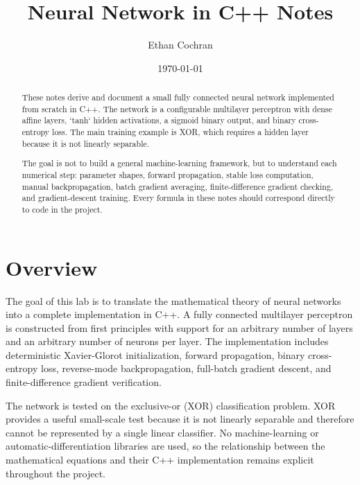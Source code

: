 \documentclass{article}
\title{Neural Network in C++ Notes}
\author{Ethan Cochran}
\date{\today}
\begin{document}
\maketitle

\begin{abstract}
These notes derive and document a small fully connected neural network implemented from scratch in C++. The network is a configurable multilayer perceptron with dense affine layers, `tanh` hidden activations, a sigmoid binary output, and binary cross-entropy loss. The main training example is XOR, which requires a hidden layer because it is not linearly separable.

The goal is not to build a general machine-learning framework, but to understand each numerical step: parameter shapes, forward propagation, stable loss computation, manual backpropagation, batch gradient averaging, finite-difference gradient checking, and gradient-descent training. Every formula in these notes should correspond directly to code in the project.    
\end{abstract}

\tableofcontents

\pagebreak

\section{Overview}


The goal of this lab is to translate the mathematical theory of neural networks into a complete implementation in C++. A fully connected multilayer perceptron is constructed from first principles with support for an arbitrary number of layers and an arbitrary number of neurons
per layer. The implementation includes deterministic Xavier-Glorot initialization, forward propagation, binary cross-entropy loss, reverse-mode backpropagation, full-batch gradient descent, and finite-difference gradient verification.

The network is tested on the exclusive-or (XOR) classification problem. XOR provides a useful small-scale test because it is not linearly separable and therefore cannot be represented by a single linear classifier. No machine-learning or automatic-differentiation libraries are used, so the relationship between the mathematical equations and their C++ implementation remains explicit throughout the project.
\end{document}
